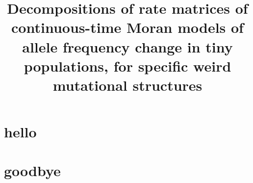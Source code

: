 \documentclass{article}
\theoremstyle{plain}
\theoremstyle{definition}
\begin{document}
\title
{
	Decompositions of rate matrices of continuous-time Moran
	models of allele frequency change in tiny populations,
	for specific weird mutational structures
}
\maketitle

\section{hello}

\section{goodbye}
\end{document}
